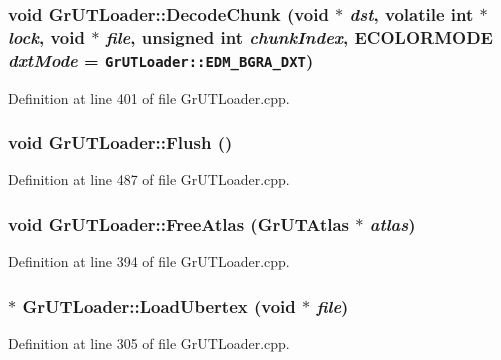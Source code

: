 \begin{CompactItemize}
{\subsubsection[{DecodeChunk}]{\setlength{\rightskip}{0pt plus 5cm}void GrUTLoader::DecodeChunk (void $\ast$ {\em dst}, \/  volatile int $\ast$ {\em lock}, \/  void $\ast$ {\em file}, \/  unsigned int {\em chunkIndex}, \/  {\bf ECOLORMODE} {\em dxtMode} = {\tt GrUTLoader::EDM\_\-BGRA\_\-DXT})}}
\label{class_gr_u_t_loader_021fb0768072b4306207993a4e8e5415}




Definition at line 401 of file GrUTLoader.cpp.\hypertarget{class_gr_u_t_loader_a2715cc250d1bdbb321200ef630756cb}{
\subsubsection[{Flush}]{\setlength{\rightskip}{0pt plus 5cm}void GrUTLoader::Flush ()}}
\label{class_gr_u_t_loader_a2715cc250d1bdbb321200ef630756cb}




Definition at line 487 of file GrUTLoader.cpp.\hypertarget{class_gr_u_t_loader_c61068d4af869e277fa8303dd2fc6689}{
\subsubsection[{FreeAtlas}]{\setlength{\rightskip}{0pt plus 5cm}void GrUTLoader::FreeAtlas ({\bf GrUTAtlas} $\ast$ {\em atlas})}}
\label{class_gr_u_t_loader_c61068d4af869e277fa8303dd2fc6689}




Definition at line 394 of file GrUTLoader.cpp.\hypertarget{class_gr_u_t_loader_8e7dbf8a92517c281d2b0587a4bcdf55}{
\subsubsection[{LoadUbertex}]{ $\ast$ GrUTLoader::LoadUbertex (void $\ast$ {\em file})}}
\label{class_gr_u_t_loader_8e7dbf8a92517c281d2b0587a4bcdf55}




Definition at line 305 of file GrUTLoader.cpp.\hypertarget{class_gr_u_t_loader_9eca6963597c1c7e5c1f378774606f2f}{
}
\end{CompactItemize}
